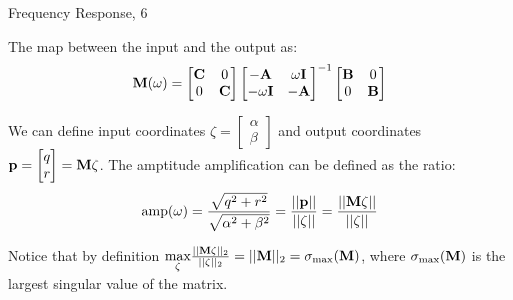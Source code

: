 \documentclass{beamer}
\begin{document}
\begin{frame}{Frequency Response, 6}
	\begin{flushleft}
		
		The map between the input and the output as:
		\begin{align}
			\mathbf{M}(\omega)
			= 
			\begin{bmatrix}
				\mathbf{C} & 0 \\  0 & \mathbf{C}
			\end{bmatrix}
			\begin{bmatrix}
				-\mathbf{A} & \omega \mathbf{I} \\
				-\omega \mathbf{I} & -\mathbf{A}
			\end{bmatrix}^{-1}
			\begin{bmatrix}
				\mathbf{B} & 0 \\  0 & \mathbf{B}
			\end{bmatrix}
		\end{align}		
		
		We can define input coordinates $\zeta = 
		\begin{bmatrix}
			\alpha \\   \beta
		\end{bmatrix}$ and output coordinates $\mathbf{p} = 
		\begin{bmatrix}
		q \\  r
		\end{bmatrix} = \mathbf{M}\zeta$. The amptitude amplification can be defined as the ratio:
		\begin{align}
			\text{amp}(\omega)
			= 
			\frac{\sqrt{q^2 + r^2}}{\sqrt{\alpha^2 + \beta^2}}
			=
			\frac{||\mathbf{p}||}{||\zeta||}
			=
			\frac{||\mathbf{M}\zeta||}{||\zeta||}
		\end{align}		
		
		Notice that by definition $\underset{\zeta}{\text{max}}\frac{||\mathbf{M}\zeta||_2}{||\zeta||_2} = ||\mathbf{M}||_2 = \sigma_{\max}(\mathbf{M})$, where $\sigma_{\max}(\mathbf{M})$ is the largest singular value of the matrix.
		
	\end{flushleft}
\end{frame}
\end{document}
